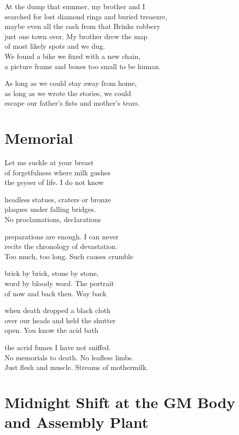 \documentclass[twoside,10pt]{book}
\begin{document}
At the dump that summer, my brother and I\\
searched for lost diamond rings and buried treasure,\\
maybe even all the cash from that Brinks robbery\\
just one town over. My brother drew the map\\
of most likely spots and we dug.\\
We found a bike we fixed with a new chain,\\
a picture frame and bones too small to be human.

As long as we could stay away from home,\\
as long as we wrote the stories, we could\\
escape our father's fists and mother's tears.


\clearpage
\section{Memorial}

Let me suckle at your breast\\
of forgetfulness where milk gushes\\
the geyser of life. I do not know

headless statues, craters or bronze\\
plaques under falling bridges.\\
No proclamations, declarations

preparations are enough. I can never\\
recite the chronology of devastation.\\
Too much, too long. Such causes crumble

brick by brick, stone by stone,\\
word by bloody word. The portrait\\
of now and back then. Way back

when death dropped a black cloth\\
over our heads and held the shutter\\
open. You know the acid bath

the acrid fumes I have not sniffed.\\
No memorials to death. No leafless limbs.\\
Just flesh and muscle. Streams of mothermilk.


\clearpage
\section{Midnight Shift at the GM Body and Assembly Plant}
\end{document}

